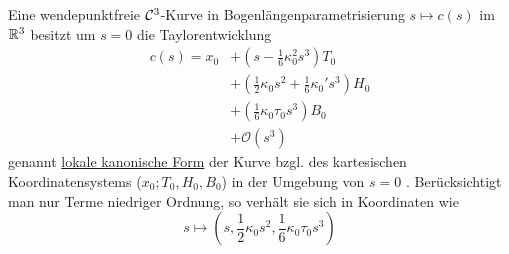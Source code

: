 \begin{satz}\label{satz136}
 Eine wendepunktfreie \(\mathcal{C}^3\)-Kurve in Bogenlängenparametrisierung \(s \mapsto c(s)\) im \(\mathbb{R}^3\) besitzt um \(s = 0\) die Taylorentwicklung
 \begin{align*}
  c(s) = x_0 &+ \left( s - \frac16 \kappa_0^2 s^3\right) T_0 \\
  &+ \left( \frac12 \kappa_0 s^2 + \frac16 \kappa_0' s^3 \right) H_0 \\
  &+ \left(  \frac16 \kappa_0 \tau_0 s^3\right) B_0 \\
  &+ \mathcal O(s^3)
 \end{align*}
 genannt \uline{lokale kanonische Form} der Kurve bzgl. des kartesischen Koordinatensystems (\(x_0; T_0, H_0, B_0\)) in der Umgebung von \(s = 0\) . Berücksichtigt man nur Terme niedriger Ordnung, so verhält sie sich in Koordinaten wie
 \[
  s \mapsto \left(s, \frac12 \kappa_0 s^2, \frac16 \kappa_0 \tau_0 s^3 \right)
 \]
\end{satz}

